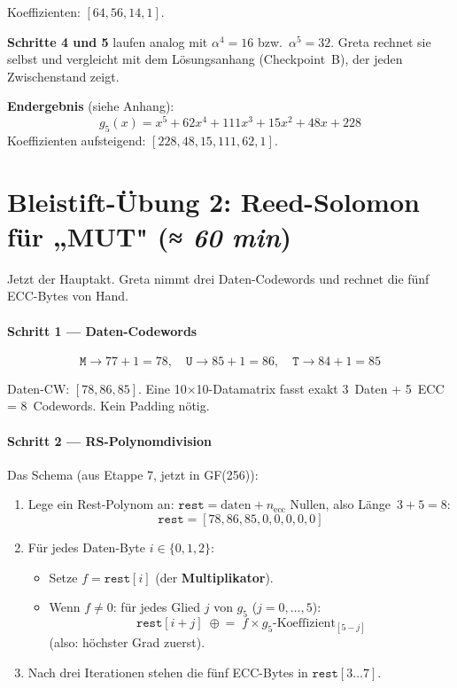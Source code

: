 Koeffizienten: $[64, 56, 14, 1]$.

\textbf{Schritte 4 und 5} laufen analog mit $\alpha^4 = 16$ bzw.\
$\alpha^5 = 32$. Greta rechnet sie selbst und vergleicht mit dem
Lösungsanhang (Checkpoint~B), der jeden Zwischenstand zeigt.

\textbf{Endergebnis} (siehe Anhang):
\[
  g_5(x) = x^5 + 62 x^4 + 111 x^3 + 15 x^2 + 48 x + 228
\]
Koeffizienten aufsteigend: $[228, 48, 15, 111, 62, 1]$.

\section{Bleistift-Übung 2: Reed-Solomon für „MUT"
         \normalfont(\textit{≈ 60 min})}

Jetzt der Hauptakt. Greta nimmt drei Daten-Codewords und rechnet die
fünf ECC-Bytes von Hand.

\paragraph{Schritt 1 — Daten-Codewords}

\[
  \texttt{M} \to 77 + 1 = 78,\quad
  \texttt{U} \to 85 + 1 = 86,\quad
  \texttt{T} \to 84 + 1 = 85
\]

Daten-CW: $[78, 86, 85]$. Eine 10×10-Datamatrix fasst exakt
3~Daten + 5~ECC = 8~Codewords. Kein Padding nötig.

\paragraph{Schritt 2 — RS-Polynomdivision}

Das Schema (aus Etappe 7, jetzt in GF(256)):

\begin{enumerate}
\item Lege ein Rest-Polynom an: $\texttt{rest} = \text{daten} + n_{\text{ecc}}$
  Nullen, also Länge~$3 + 5 = 8$:
  \[
    \texttt{rest} = [78, 86, 85, 0, 0, 0, 0, 0]
  \]
\item Für jedes Daten-Byte $i \in \{0, 1, 2\}$:
  \begin{itemize}
  \item Setze $f = \texttt{rest}[i]$ (der \textbf{Multiplikator}).
  \item Wenn $f \ne 0$: für jedes Glied $j$ von $g_5$ ($j = 0, \dots, 5$):
    \[
      \texttt{rest}[i + j] \;\mathrel{\oplus}\!=\; f \times g_5\text{-Koeffizient}_{[5 - j]}
    \]
    (also: höchster Grad zuerst).
  \end{itemize}
\item Nach drei Iterationen stehen die fünf ECC-Bytes in
  $\texttt{rest}[3 \dots 7]$.
\end{enumerate}

